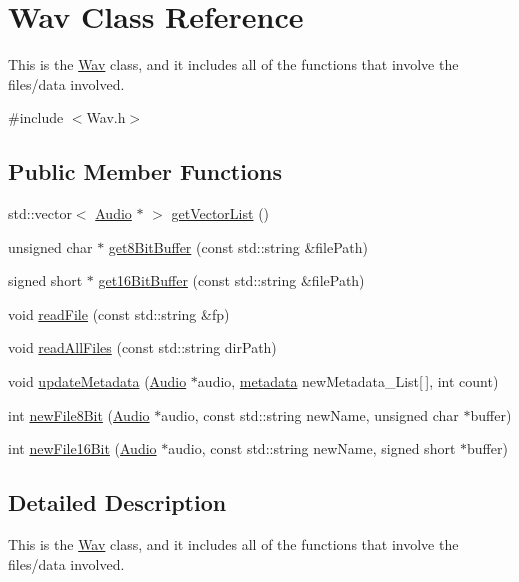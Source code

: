 \hypertarget{classWav}{}\section{Wav Class Reference}
\label{classWav}


This is the \hyperlink{classWav}{Wav} class, and it includes all of the functions that involve the files/data involved.  




{\ttfamily \#include $<$Wav.\+h$>$}

\subsection*{Public Member Functions}
\begin{DoxyCompactItemize}
\item 
std\+::vector$<$ \hyperlink{classAudio}{Audio} $\ast$ $>$ \hyperlink{classWav_a68f79590f248a0db8f191f9e8d2d6672}{get\+Vector\+List} ()
\item 
unsigned char $\ast$ \hyperlink{classWav_a071344357789033b5afffbbbfbb5581b}{get8\+Bit\+Buffer} (const std\+::string \&file\+Path)
\item 
signed short $\ast$ \hyperlink{classWav_af1315b1ca824a7eadc2e85791004f884}{get16\+Bit\+Buffer} (const std\+::string \&file\+Path)
\item 
void \hyperlink{classWav_ae221a6a2d17ca08073ad82a017843e99}{read\+File} (const std\+::string \&fp)
\item 
void \hyperlink{classWav_a425a8f6fa3f47390617b272c353231ea}{read\+All\+Files} (const std\+::string dir\+Path)
\item 
void \hyperlink{classWav_a884d7be7c44a3f79dacf2a6f5b2e635f}{update\+Metadata} (\hyperlink{classAudio}{Audio} $\ast$audio, \hyperlink{structmetadata}{metadata} new\+Metadata\+\_\+\+List\mbox{[}$\,$\mbox{]}, int count)
\item 
int \hyperlink{classWav_a0df3872a0d777f8407de71ba71f756f4}{new\+File8\+Bit} (\hyperlink{classAudio}{Audio} $\ast$audio, const std\+::string new\+Name, unsigned char $\ast$buffer)
\item 
int \hyperlink{classWav_a4c3a3ebc811a2d4a4acd0fee974030d9}{new\+File16\+Bit} (\hyperlink{classAudio}{Audio} $\ast$audio, const std\+::string new\+Name, signed short $\ast$buffer)
\end{DoxyCompactItemize}


\subsection{Detailed Description}
This is the \hyperlink{classWav}{Wav} class, and it includes all of the functions that involve the files/data involved. 


